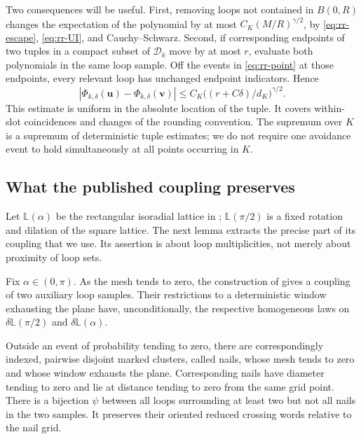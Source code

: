Two consequences will be useful.  First, removing loops not
contained in $B(0,R)$ changes the expectation of the polynomial by
at most $C_K(M/R)^{\gamma/2}$, by
\eqref{eq:rr-escape}, \eqref{eq:rr-UI}, and Cauchy--Schwarz.
Second, if corresponding endpoints of two tuples in a compact
subset of $\mathcal D_k$ move by at most $r$, evaluate both
polynomials in the same loop sample.  Off the events in
\eqref{eq:rr-point} at those endpoints, every relevant loop has
unchanged endpoint indicators.  Hence
\begin{equation}
 |\Phi_{k,\delta}(\boldsymbol u)
                   -\Phi_{k,\delta}(\boldsymbol v)|
       \le C_K\bigl((r+C\delta)/d_K\bigr)^{\gamma/2}.
 \label{eq:rr-continuity}
\end{equation}
This estimate is uniform in the absolute location of the tuple.
It covers within-slot coincidences and changes of the rounding
convention.  The supremum over $K$ is a supremum of deterministic
tuple estimates; we do not require one avoidance event to hold
simultaneously at all points occurring in $K$.

\subsection{What the published coupling preserves}

Let $\mathbb L(\alpha)$ be the rectangular isoradial lattice in
\cite[Section~1.4]{DCKKMO2026Rotation};
$\mathbb L(\pi/2)$ is a fixed rotation and dilation of the square
lattice.  The next lemma extracts the precise part of its coupling
that we use.  Its assertion is about loop multiplicities, not merely
about proximity of loop sets.

\begin{lemma}
\label{lem:rr-nails}
Fix $\alpha\in(0,\pi)$.  As the mesh tends to zero, the construction
of \cite[Section~3.6]{DCKKMO2026Rotation} gives a coupling of two
auxiliary loop samples.  Their restrictions to a deterministic
window exhausting the plane have, unconditionally, the respective
homogeneous laws on $\delta\mathbb L(\pi/2)$ and
$\delta\mathbb L(\alpha)$.

Outside an event of probability tending to zero, there are
correspondingly indexed, pairwise disjoint marked
clusters, called nails, whose mesh tends to zero and whose window
exhausts the plane.  Corresponding nails have diameter tending to
zero and lie at distance tending to zero from the same grid point.
There is a bijection $\psi$ between all loops surrounding at least
two but not all nails in the two samples.  It preserves their
oriented reduced crossing words relative to the nail grid.
\end{lemma}

